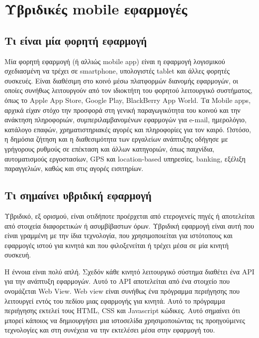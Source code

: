 \documentclass[a4paper,12pt]{article}
\begin{document}
	\newpage
	\section{Υβριδικές mobile εφαρμογές}
	
		\subsection{Τι είναι μία φορητή εφαρμογή}
		
			Μία φορητή εφαρμογή (ή αλλιώς mobile app) είναι η εφαρμογή λογισμικού σχεδιασμένη να
			τρέχει σε smartphone, υπολογιστές tablet και άλλες φορητές συσκευές. Είναι διαθέσιμη στο κοινό μέσω πλατφορμών διανομής εφαρμογών, οι οποίες συνήθως λειτουργούν από τον
			ιδιοκτήτη του φορητού λειτουργικό συστήματος, όπως το Apple App Store, Google Play, BlackBerry App World.
			Τα Mobile apps, αρχικά είχαν στόχο την προσφορά στη γενική παραγωγικότητα του κοινού και
			την ανάκτηση πληροφοριών, συμπεριλαμβανομένων εφαρμογών για e-mail, ημερολόγιο, κατάλογο
			επαφών, χρηματιστηριακές αγορές και πληροφορίες για τον καιρό. Ωστόσο, η δημόσια ζήτηση και
			η διαθεσιμότητα των εργαλείων ανάπτυξης οδήγησε με γρήγορους ρυθμούς σε επέκταση και άλλων
			κατηγοριών, όπως παιχνίδια, αυτοματισμούς εργοστασίων, GPS και location-based υπηρεσίες,
			banking, εξέλιξη παραγγελιών, καθώς και στις αγορές εισιτηρίων.
		
		\subsection{Τι σημαίνει υβριδική εφαρμογή}
		
			Υβριδικό, εξ ορισμού, είναι οτιδήποτε προέρχεται από ετερογενείς πηγές ή αποτελείται από στοιχεία διαφορετικών ή ασυμβίβαστων όρων. Υβριδική εφαρμογή είναι αυτή που 
			είναι γραμμένη με την ίδια τεχνολογία, που χρησιμοποιείται για ιστότοπους και εφαρμογές ιστού για κινητά και που φιλοξενείται ή τρέχει μέσα σε μία κινητή συσκευή. 
				
			Η έννοια είναι πολύ απλή. Σχεδόν κάθε κινητό λειτουργικό σύστημα διαθέτει ένα API για την ανάπτυξη εφαρμογών. 
			Αυτό το API αποτελείται από ένα στοιχείο που ονομάζεται Web View. Web view είναι συνήθως ένα πρόγραμμα περιήγησης που λειτουργεί εντός του πεδίου μιας εφαρμογής για κινητά. 
			Αυτό το πρόγραμμα περιήγησης εκτελεί τους HTML, CSS και Javascript κώδικες. Αυτό σημαίνει ότι μπορεί κάποιος να δημιουργήσει μια ιστοσελίδα χρησιμοποιώντας τις προηγούμενες 
			τεχνολογίες και στη συνέχεια να την εκτελέσει μέσα στην εφαρμογή του.
							
\end{document}
